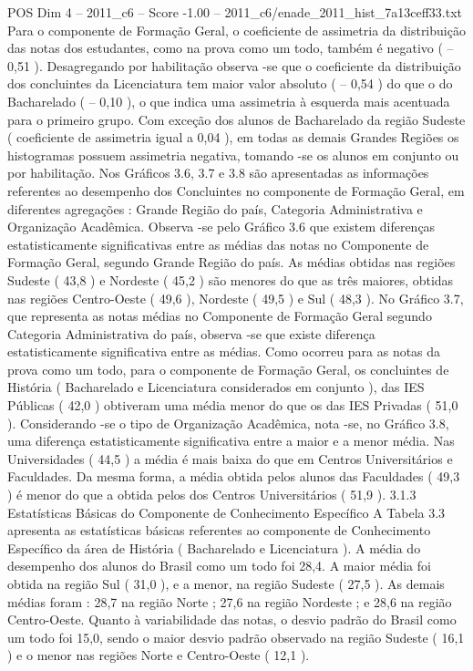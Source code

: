 \begin{textsample}{POS Dim 4 – 2011\_c6 – Score -1.00 – 2011\_c6/enade\_2011\_hist\_7a13ceff33.txt}
Para o componente de Formação Geral, o coeficiente de assimetria da distribuição das notas dos estudantes, como na prova como um todo, também é negativo ( – 0,51 ).
Desagregando por habilitação observa -se que o coeficiente da distribuição dos concluintes da Licenciatura tem maior valor absoluto ( – 0,54 ) do que o do Bacharelado ( – 0,10 ), o que indica uma assimetria à esquerda mais acentuada para o primeiro grupo.
Com exceção dos alunos de Bacharelado da região Sudeste ( coeficiente de assimetria igual a 0,04 ), em todas as demais Grandes Regiões os histogramas possuem assimetria negativa, tomando -se os alunos em conjunto ou por habilitação.
Nos Gráficos 3.6, 3.7 e 3.8 são apresentadas as informações referentes ao desempenho dos Concluintes no componente de Formação Geral, em diferentes agregações : Grande Região do país, Categoria Administrativa e Organização Acadêmica.
Observa -se pelo Gráfico 3.6 que existem diferenças estatisticamente significativas entre as médias das notas no Componente de Formação Geral, segundo Grande Região do país.
As médias obtidas nas regiões Sudeste ( 43,8 ) e Nordeste ( 45,2 ) são menores do que as três maiores, obtidas nas regiões Centro-Oeste ( 49,6 ), Nordeste ( 49,5 ) e Sul ( 48,3 ).
No Gráfico 3.7, que representa as notas médias no Componente de Formação Geral segundo Categoria Administrativa do país, observa -se que existe diferença estatisticamente significativa entre as médias.
Como ocorreu para as notas da prova como um todo, para o componente de Formação Geral, os concluintes de História ( Bacharelado e Licenciatura considerados em conjunto ), das IES Públicas ( 42,0 ) obtiveram uma média menor do que os das IES Privadas ( 51,0 ).
Considerando -se o tipo de Organização Acadêmica, nota -se, no Gráfico 3.8, uma diferença estatisticamente significativa entre a maior e a menor média.
Nas Universidades ( 44,5 ) a média é mais baixa do que em Centros Universitários e Faculdades.
Da mesma forma, a média obtida pelos alunos das Faculdades ( 49,3 ) é menor do que a obtida pelos dos Centros Universitários ( 51,9 ). 3.1.3 Estatísticas Básicas do Componente de Conhecimento Específico A Tabela 3.3 apresenta as estatísticas básicas referentes ao componente de Conhecimento Específico da área de História ( Bacharelado e Licenciatura ).
A média do desempenho dos alunos do Brasil como um todo foi 28,4.
A maior média foi obtida na região Sul ( 31,0 ), e a menor, na região Sudeste ( 27,5 ).
As demais médias foram : 28,7 na região Norte ; 27,6 na região Nordeste ; e 28,6 na região Centro-Oeste.
Quanto à variabilidade das notas, o desvio padrão do Brasil como um todo foi 15,0, sendo o maior desvio padrão observado na região Sudeste ( 16,1 ) e o menor nas regiões Norte e Centro-Oeste ( 12,1 ).

\end{textsample}
